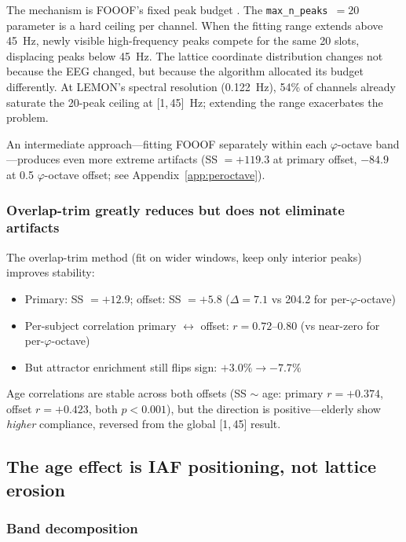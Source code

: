 \documentclass[11pt,a4paper]{article}
\newcommand{\phisym}{\varphi}
\begin{document}
\begin{criticalpoint}
The mechanism is FOOOF's fixed peak budget \parencite{Ostlund2022}. The \texttt{max\_n\_peaks}~$= 20$ parameter is a hard ceiling per channel. When the fitting range extends above 45~Hz, newly visible high-frequency peaks compete for the same 20 slots, displacing peaks below 45~Hz. The lattice coordinate distribution changes not because the EEG changed, but because the algorithm allocated its budget differently. At LEMON's spectral resolution (0.122~Hz), 54\% of channels already saturate the 20-peak ceiling at [1,\,45]~Hz; extending the range exacerbates the problem.
\end{criticalpoint}

An intermediate approach---fitting FOOOF separately within each $\phisym$-octave band---produces even more extreme artifacts (SS $= +119.3$ at primary offset, $-84.9$ at 0.5 $\phisym$-octave offset; see Appendix~\ref{app:peroctave}).

\subsubsection{Overlap-trim greatly reduces but does not eliminate artifacts}

The overlap-trim method (fit on wider windows, keep only interior peaks) improves stability:
\begin{itemize}
    \item Primary: SS $= +12.9$; offset: SS $= +5.8$ ($\Delta = 7.1$ vs 204.2 for per-$\phisym$-octave)
    \item Per-subject correlation primary $\leftrightarrow$ offset: $r = 0.72$--$0.80$ (vs near-zero for per-$\phisym$-octave)
    \item But attractor enrichment still flips sign: $+3.0\% \to -7.7\%$
\end{itemize}
Age correlations are stable across both offsets (SS $\sim$ age: primary $r = +0.374$, offset $r = +0.423$, both $p < 0.001$), but the direction is positive---elderly show \textit{higher} compliance, reversed from the global [1,\,45] result.

\subsection{The age effect is IAF positioning, not lattice erosion}

\subsubsection{Band decomposition}
\end{document}
